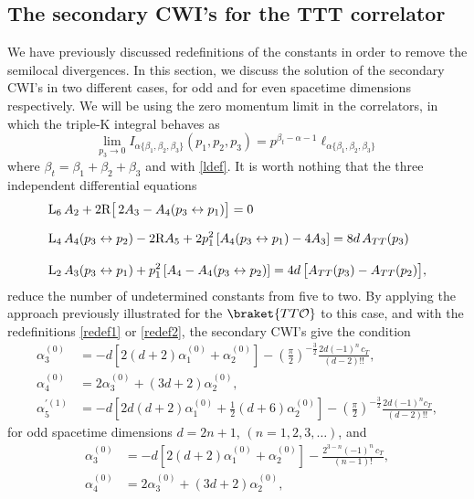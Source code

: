 \documentclass[a4paper,11pt,openright,twoside]{book}
\newcommand{\mO}{\mathcal{O}}
\let\a=\alpha   \let\b=\beta   \let\g=\gamma   \let\d=\delta
\numberwithin{equation}{section}
\begin{document}
{{\subsection{The secondary CWI's for the TTT correlator}\label{appendixH}
{ We have previously discussed redefinitions of the constants in order to remove the semilocal divergences. In this section, we discuss the solution of the secondary CWI's in two different cases, for odd and for even spacetime dimensions respectively. We will be using the zero momentum limit in the correlators, in which the triple-K integral behaves as
\begin{equation}
	\lim_{p_3\to 0}I_{\alpha\{\beta_1,\beta_2,\beta_3\}}(p_1,p_2,p_3)=p^{\beta_t-\alpha-1}\ell_{\alpha\{\beta_1,\beta_2,\beta_3\}}\label{limit}
\end{equation}
where $\beta_t=\beta_1+\beta_2+\beta_3$ and with \eqref{ldef}. It is worth nothing that the three independent differential equations 
\begin{align}
	&\textup{L}_6\, A_2 + 2\textup{R}\bigl[\,2A_3-A_4(p_3\leftrightarrow p_1)\bigr]=0\\[1.5 ex] 
	&\textup{L}_4\, A_4(p_3\leftrightarrow p_2)  - 2\textup{R}A_5+2p_1^2\left[A_4(p_3\leftrightarrow p_1)-4A_3\right]=8d\,A_{TT}(p_3)\\[2 ex]  
	&\textup{L}_2\, A_3(p_3\leftrightarrow p_1) +p_1^2\left[A_4-A_4(p_3\leftrightarrow p_2)\right]=4d\,\big[A_{TT}(p_3)-A_{TT}(p_2)\big],
\end{align}
reduce the number of undetermined constants from five to two. By applying the approach previously illustrated for the $\braket{TT\mO}$ to this case, and with the redefinitions \eqref{redef1} or \eqref{redef2}, the secondary CWI's give the condition
\begin{align}
	\a_3^{(0)}&=-d\left[2(d+2)\a_1^{(0)}+\a_2^{(0)}\right]-\left(\frac{\pi}{2}\right)^{-\frac{3}{2}}\frac{2d(-1)^n\,c_T}{(d-2)!!},\\
	\a_4^{(0)}&=2\a_3^{(0)}+(3d+2)\a_2^{(0)},\\
	\a_5^{\prime(1)}&=-d\left[2d(d+2)\a_1^{(0)}+\frac{1}{2}(d+6)\a_2^{(0)}\right]-\left(\frac{\pi}{2}\right)^{-\frac{3}{2}}\frac{2d(-1)^{n}c_T}{(d-2)!!},
\end{align}
for odd spacetime dimensions $d=2n+1$, $(n=1,2,3,\dots)$, and 
\begin{align}
	\a_3^{(0)}&=-d\left[2(d+2)\a_1^{(0)}+\a_2^{(0)}\right]-\frac{2^{3-n}(-1)^n\,c_T}{(n-1)!},\\
	\a_4^{(0)}&=2\a_3^{(0)}+(3d+2)\a_2^{(0)},\\

\end{align}}}}
\end{document}
